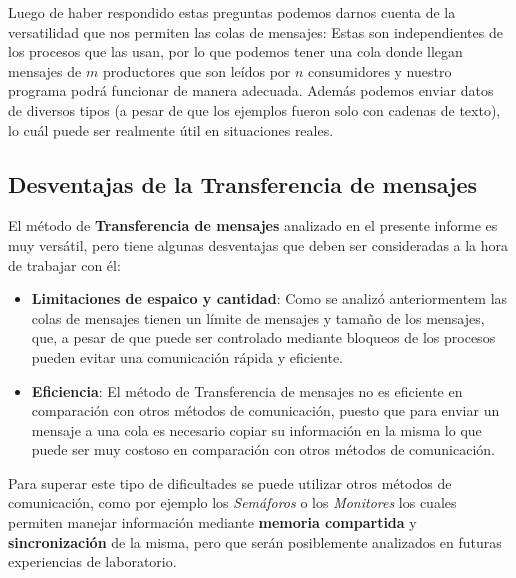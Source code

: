 Luego de haber respondido estas preguntas podemos darnos cuenta de la versatilidad que nos permiten las colas de mensajes: Estas son independientes de los procesos que las usan, por lo que podemos tener una cola donde llegan mensajes de $m$ productores que son leídos por $n$ consumidores y nuestro programa podrá funcionar de manera adecuada. Además podemos enviar datos de diversos tipos (a pesar de que los ejemplos fueron solo con cadenas de texto), lo cuál puede ser realmente útil en situaciones reales.

\subsection{Desventajas de la Transferencia de mensajes}
El método de \textbf{Transferencia de mensajes} analizado en el presente informe es muy versátil, pero tiene algunas desventajas que deben ser consideradas a la hora de trabajar con él:
\begin{itemize}
    \item \textbf{Limitaciones de espaico y cantidad}: Como se analizó anteriormentem las colas de mensajes tienen un límite de mensajes y tamaño de los mensajes, que, a pesar de que puede ser controlado mediante bloqueos de los procesos pueden evitar una comunicación rápida y eficiente.
    \item \textbf{Eficiencia}: El método de Transferencia de mensajes no es eficiente en comparación con otros métodos de comunicación, puesto que para enviar un mensaje a una cola es necesario copiar su información en la misma lo que puede ser muy costoso en comparación con otros métodos de comunicación.
\end{itemize}

Para superar este tipo de dificultades se puede utilizar otros métodos de comunicación, como por ejemplo los \textit{Semáforos} o los \textit{Monitores} los cuales permiten manejar información mediante \textbf{memoria compartida} y \textbf{sincronización} de la misma, pero que serán posiblemente analizados en futuras experiencias de laboratorio.